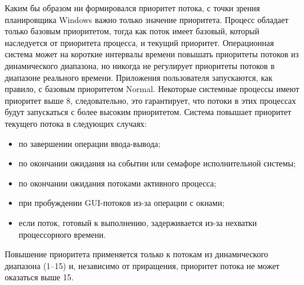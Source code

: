 \documentclass[a4paper,oneside,14pt]{extreport}
\begin{document}
	Каким бы образом ни формировался приоритет потока, с точки зрения планировщика Windows важно только значение приоритета.
	Процесс обладает только базовым приоритетом, тогда как поток имеет базовый, который наследуется от приоритета процесса, и текущий приоритет. Операционная система может на короткие интервалы времени повышать приоритеты потоков из динамического диапазона, но никогда не регулирует приоритеты потоков в диапазоне реального времени.
	Приложения пользователя запускаются, как правило, с базовым приоритетом Normal. Некоторые системные процессы имеют приоритет выше 8, следовательно, это гарантирует, что потоки в этих процессах будут запускаться с более высоким приоритетом.
	Система повышает приоритет текущего потока в следующих случаях:
	\begin{itemize}
		\item по завершении операции ввода-вывода;
		\item по окончании ожидания на событии или семафоре исполнительной системы;
		\item по окончании ожидания потоками активного процесса;
		\item при пробуждении GUI-потоков из-за операции с окнами;
		\item если поток, готовый к выполнению, задерживается из-за нехватки процессорного времени.
	\end{itemize}
	Повышение приоритета применяется только к потокам из динамического диапазона (1--15) и, независимо от приращения, приоритет потока не может оказаться выше 15.
\end{document}
